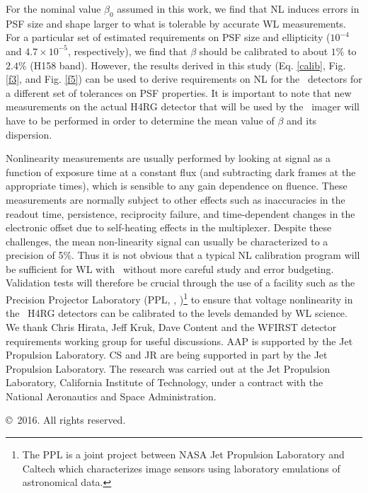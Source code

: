 \documentclass[11pt,preprint,flushrt]{aastex}
\begin{document}
For the nominal value $\beta_0$ assumed in this work, we find that NL induces errors in PSF size and shape larger to what is tolerable by accurate WL measurements. For a particular set of estimated requirements on PSF size and ellipticity ($10^{-4}$  and $4.7\times 10^{-5}$, respectively), we find that  $\beta$ should be calibrated to about $1\%$ to $2.4\%$ (H158 band). However, the results derived in this study (Eq. \ref{calib}, Fig. \ref{f3}, and Fig. \ref{f5}) can be used to derive requirements on NL for the \wfa\ detectors for a different set of tolerances on PSF properties. It is important to note that new measurements on the actual H4RG detector that will be used by the \wf\ imager will have to be performed in order to determine the mean value of $\beta$ and its dispersion.

Nonlinearity measurements are usually performed by looking at signal as a function of exposure time at a constant flux (and subtracting dark frames at the appropriate times), which is sensible to any gain dependence on fluence. These measurements are normally subject to other effects such as inaccuracies in the readout time, persistence, reciprocity failure, and time-dependent changes in the electronic offset due to self-heating effects in the multiplexer. Despite these challenges, the mean non-linearity signal can usually be characterized to a precision of 5$\%$. Thus it is not obvious that a typical NL calibration program will be sufficient for WL with \wf\ without more careful study and error budgeting.
Validation tests will therefore be crucial through the use of a facility such as the 
Precision Projector Laboratory (PPL, \citealt{seshadri13}, \citealt{shapiro13})\footnote{The PPL is a joint project between NASA Jet Propulsion Laboratory and Caltech which characterizes image sensors using laboratory emulations of astronomical data.} to ensure that voltage nonlinearity in the \wf\ H4RG detectors can be calibrated to the levels demanded by WL science.\\

We thank Chris Hirata, Jeff Kruk, Dave Content and the WFIRST detector requirements working group for useful discussions. AAP is supported by the Jet Propulsion Laboratory. CS and JR are being supported in part by the Jet Propulsion Laboratory. The research was carried out at the Jet Propulsion Laboratory, California Institute of Technology, under a contract with the National Aeronautics and Space Administration.

\copyright\ 2016. All rights reserved.





\acknowledgments


\end{document}
